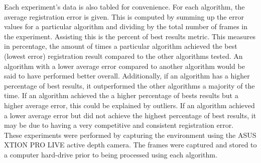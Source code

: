 Each experiment's data is also tabled for convenience. For each algorithm, the average registration error is given. This is computed by summing up the error values for a particular algorithm and dividing by the total number of frames in the experiment. Assisting this is the percent of best results metric. This measures in percentage, the amount of times a particular algorithm achieved the best (lowest error) registration result compared to the other algorithms tested. An algorithm with a lower average error compared to another algorithm would be said to have performed better overall. Additionally, if an algorithm has a higher percentage of best results, it outperformed the other algorithms a majority of the time. If an algorithm achieved the a higher percentage of bests results but a higher average error, this could be explained by outliers. If an algorithm achieved a lower average error but did not achieve the highest percentage of best results, it may be due to having a very competitive and consistent registration error. \\

These experiments were performed by capturing the environment using the ASUS XTION PRO LIVE active depth camera. The frames were captured and stored to a computer hard-drive prior to being processed using each algorithm. \\

